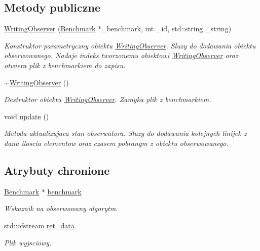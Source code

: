 \subsection*{Metody publiczne}
\begin{DoxyCompactItemize}
\item 
\hyperlink{class_writing_observer_a3bf650722f5e74b0851733bfd1cb7931}{Writing\-Observer} (\hyperlink{class_benchmark}{Benchmark} $\ast$\-\_\-benchmark, int \-\_\-id, std\-::string \-\_\-string)
\begin{DoxyCompactList}\small\item\em Konstruktor parametryczny obiektu \hyperlink{class_writing_observer}{Writing\-Observer}. Sluzy do dodawania obiektu obserwowanego. Nadaje indeks tworzonemu obiektowi \hyperlink{class_writing_observer}{Writing\-Observer} oraz otwiera plik z benchmarkiem do zapisu. \end{DoxyCompactList}\item 
\hyperlink{class_writing_observer_a94f0c7b3f3fe9d96771912ddac3f5333}{$\sim$\-Writing\-Observer} ()
\begin{DoxyCompactList}\small\item\em Destruktor obiektu \hyperlink{class_writing_observer}{Writing\-Observer}. Zamyka plik z benchmarkiem. \end{DoxyCompactList}\item 
void \hyperlink{class_writing_observer_a7b5aa3fa85ae0e1d27ccd8b08366f043}{update} ()
\begin{DoxyCompactList}\small\item\em Metoda aktualizujaca stan obserwatora. Sluzy do dodawania kolejnych linijek z dana iloscia elementow oraz czasem pobranym z obiektu obserwowanego. \end{DoxyCompactList}\end{DoxyCompactItemize}
\subsection*{Atrybuty chronione}
\begin{DoxyCompactItemize}
\item 
\hyperlink{class_benchmark}{Benchmark} $\ast$ \hyperlink{class_writing_observer_a1db5db63499d7345e7a1ad42316a4f01}{benchmark}
\begin{DoxyCompactList}\small\item\em Wskaznik na obserwowany algorytm. \end{DoxyCompactList}\item 
std\-::ofstream \hyperlink{class_writing_observer_a45c8c4d5ae006232061423c657fd1eeb}{ret\-\_\-data}
\begin{DoxyCompactList}\small\item\em Plik wyjsciowy. \end{DoxyCompactList}\end{DoxyCompactItemize}



